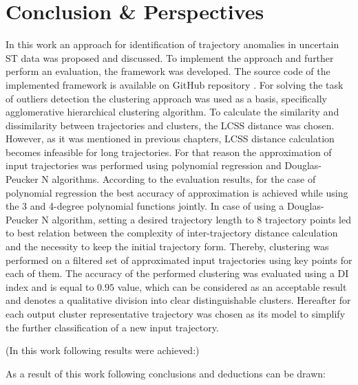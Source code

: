 \chapter{Conclusion \& Perspectives}
\label{ch:Conclusion & Perspectives}

In this work an approach for identification of trajectory anomalies in uncertain ST data was proposed and discussed. To implement the approach and further perform an evaluation, the framework was developed. The source code of the implemented framework is available on GitHub repository \cite{online:mt_anomalies}. For solving the task of outliers detection the clustering approach was used as a basis, specifically agglomerative hierarchical clustering algorithm. To calculate the similarity and dissimilarity between trajectories and clusters, the LCSS distance was chosen. However, as it was mentioned in previous chapters, LCSS distance calculation becomes infeasible for long trajectories. For that reason the approximation of input trajectories was performed using polynomial regression and Douglas-Peucker N algorithms. According to the evaluation results, for the case of polynomial regression the best accuracy of approximation is achieved while using the 3 and 4-degree polynomial functions jointly. In case of using a Douglas-Peucker N algorithm, setting a desired trajectory length to 8 trajectory points led to best relation between the complexity of inter-trajectory distance calculation and 
the necessity to keep the initial trajectory form. Thereby, clustering was performed on a filtered set of approximated input trajectories using key points for each of them. The accuracy of the performed clustering was evaluated using a DI index and is equal to $0.95$ value, which can be considered as an acceptable result and denotes a qualitative division into clear distinguishable clusters. Hereafter for each output cluster representative trajectory was chosen as its model to simplify the further classification of a new input trajectory.

(In this work following results were achieved:)

As a result of this work following conclusions and deductions can be drawn:

